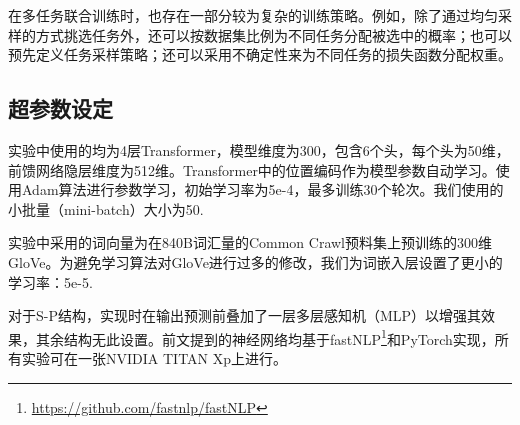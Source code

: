 在多任务联合训练时，也存在一部分较为复杂的训练策略。例如，除了通过均匀采样的方式挑选任务外，还可以按数据集比例为不同任务分配被选中的概率\cite{sanh2018hierarchical}；也可以预先定义任务采样策略\cite{DBLP:journals/tacl/KiperwasserB18}；还可以采用不确定性来为不同任务的损失函数分配权重\cite{DBLP:conf/cvpr/KendallGC18}。

\subsection{超参数设定}
实验中使用的均为4层Transformer，模型维度为300，包含6个头，每个头为50维，前馈网络隐层维度为512维。Transformer中的位置编码作为模型参数自动学习。使用Adam算法\cite{kingma2015adam}进行参数学习，初始学习率为5e-4，最多训练30个轮次。我们使用的小批量（mini-batch）大小为50. 

实验中采用的词向量为在840B词汇量的Common Crawl预料集上预训练的300维GloVe\cite{DBLP:conf/emnlp/PenningtonSM14}。为避免学习算法对GloVe进行过多的修改，我们为词嵌入层设置了更小的学习率：5e-5.

对于S-P结构，实现时在输出预测前叠加了一层多层感知机（MLP）以增强其效果，其余结构无此设置。前文提到的神经网络均基于fastNLP\footnote{\url{https://github.com/fastnlp/fastNLP}}和PyTorch实现，所有实验可在一张NVIDIA TITAN Xp上进行。